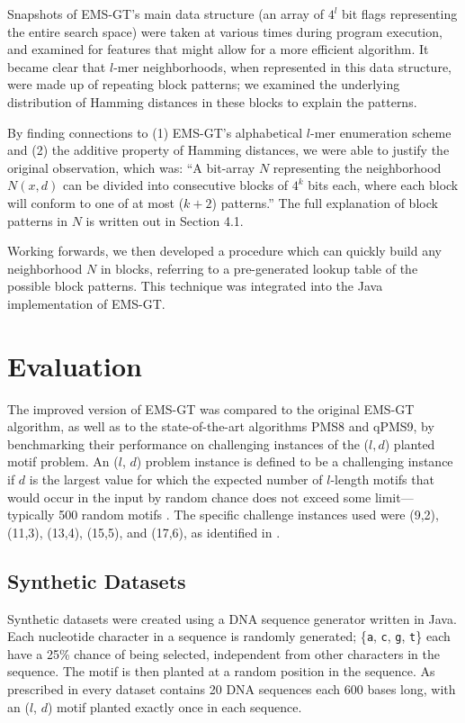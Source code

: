 \documentclass[oneside,12pt]{DISCSthesis}
\begin{document}
{		Snapshots of EMS-GT's main data structure (an array of $4^l$ bit flags representing the entire search space) were taken at various times during program execution, and examined for features that might allow for a more efficient algorithm. It became clear that $l$-mer neighborhoods, when represented in this data structure, were made up of repeating block patterns; we examined the underlying distribution of Hamming distances in these blocks to explain the patterns.

		By finding connections to (1) EMS-GT's alphabetical $l$-mer enumeration scheme and (2) the additive property of Hamming distances, we were able to justify the original observation, which was: ``A bit-array $N$ representing the neighborhood $N(x,d)$ can be divided into consecutive blocks of $4^k$ bits each, where each block will conform to one of at most ($k+2$) patterns.'' The full explanation of block patterns in $N$ is written out in Section 4.1.
		
		Working forwards, we then developed a procedure which can quickly build any neighborhood $N$ in blocks, referring to a pre-generated lookup table of the possible block patterns. This technique was integrated into the Java implementation of EMS-GT.

	\section{Evaluation}
		The improved version of EMS-GT was compared to the original EMS-GT algorithm, as well as to the state-of-the-art algorithms PMS8 and qPMS9, by benchmarking their performance on challenging instances of the ($l, d$) planted motif problem. An ($l$, $d$) problem instance is defined to be a challenging instance if $d$ is the largest value for which the expected number of $l$-length motifs that would occur in the input by random chance does not exceed some limit---typically 500 random motifs \cite{pms2015}. The specific challenge instances used were (9,2), (11,3), (13,4), (15,5), and (17,6), as identified in \cite{pms2015,pms2007}. 

		\subsection{Synthetic Datasets}
			Synthetic datasets were created using a DNA sequence generator written in Java. Each nucleotide character in a sequence is randomly generated; \{\texttt{a}, \texttt{c}, \texttt{g}, \texttt{t}\} each have a 25\% chance of being selected, independent from other characters in the sequence.
			The motif is then planted at a random position in the sequence. As prescribed in \cite{pevzner2000combinatorial} every dataset contains 20 DNA sequences each 600 bases long, with an ($l$, $d$) motif planted exactly once in each sequence.

}
\end{document}
